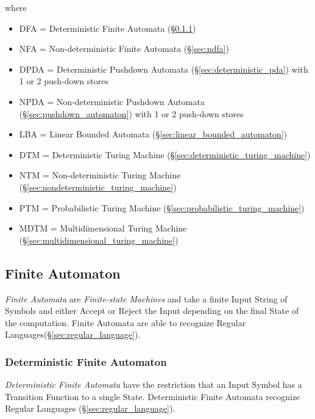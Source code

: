 where
\begin{itemize}
\item DFA = Deterministic Finite Automata (\S\ref{sec:dfa})
\item NFA = Non-deterministic Finite Automata (\S\ref{sec:ndfa})
\item DPDA = Deterministic Pushdown Automata
  (\S\ref{sec:deterministic_pda}) with 1 or 2 push-down stores
\item NPDA = Non-deterministic Pushdown Automata
  (\S\ref{sec:pushdown_automaton}) with 1 or 2 push-down stores
\item LBA = Linear Bounded Automata
  (\S\ref{sec:linear_bounded_automaton})
\item DTM = Deterministic Turing Machine
  (\S\ref{sec:deterministic_turing_machine})
\item NTM = Non-deterministic Turing Machine
  (\S\ref{sec:nondeterministic_turing_machine})
\item PTM = Probabilistic Turing Machine
  (\S\ref{sec:probabilistic_turing_machine})
\item MDTM = Multidimensional Turing Machine
  (\S\ref{sec:multidimensional_turing_machine})
\end{itemize}



\subsection{Finite Automaton}\label{sec:finite_automaton}

\emph{Finite Automata} are \emph{Finite-state Machines} and take a
finite Input String of Symbols and either Accept or Reject the Input
depending on the final State of the computation. Finite Automata are
able to recognize Regular Languages(\S\ref{sec:regular_language}).



\subsubsection{Deterministic Finite Automaton}\label{sec:dfa}

\emph{Deterministic Finite Automata} have the restriction that an
Input Symbol has a Transition Function to a single State.
Deterministic Finite Automata recognize Regular
Languages (\S\ref{sec:regular_language}).

